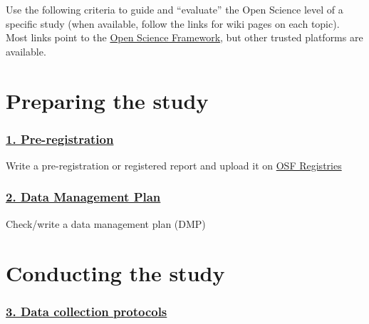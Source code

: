 \documentclass[
  letterpaper,
  DIV=11,
  numbers=noendperiod]{scrreprt}
\begin{document}

Use the following criteria to guide and ``evaluate'' the Open Science
level of a specific study (when available, follow the links for wiki
pages on each topic). Most links point to the \href{www.osf.io}{Open
Science Framework}, but other trusted platforms are available.

\hypertarget{preparing-the-study}{%
\section*{Preparing the study}\label{preparing-the-study}}


\hypertarget{pre-registration}{%
\subsubsection*{\texorpdfstring{\protect\hyperlink{pre-registration-1}{1.
Pre-registration}}{1. Pre-registration}}\label{pre-registration}}

Write a pre-registration or registered report and upload it on
\href{https://osf.io/registries}{OSF Registries}

\hypertarget{data-management-plan}{%
\subsubsection*{\texorpdfstring{\protect\hyperlink{data-management-plan-dmp}{2.
Data Management
Plan}}{2. Data Management Plan}}\label{data-management-plan}}

Check/write a data management plan (DMP)

\hypertarget{conducting-the-study}{%
\section*{Conducting the study}\label{conducting-the-study}}


\hypertarget{data-collection-protocols}{%
\subsubsection*{\texorpdfstring{\protect\hyperlink{data-collection-protocols-1}{3.
Data collection
protocols}}{3. Data collection protocols}}\label{data-collection-protocols}}
\end{document}
